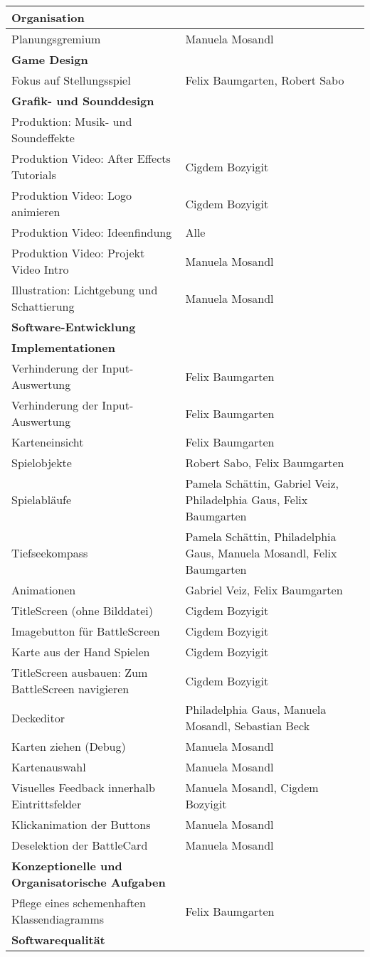 \begin{tabular}{|p{8cm}|p{10cm}|}
\hline
\textbf{Organisation} &  \\ \hline
Planungsgremium & Manuela Mosandl \\ \hline
\textbf{Game Design} &  \\ \hline
Fokus auf Stellungsspiel & Felix Baumgarten, Robert Sabo \\ \hline
\textbf{Grafik- und Sounddesign} & \\ \hline
Produktion: Musik- und Soundeffekte & \\ \hline
Produktion Video: After Effects Tutorials & Cigdem Bozyigit \\ \hline
Produktion Video: Logo animieren & Cigdem Bozyigit \\ \hline
Produktion Video: Ideenfindung & Alle \\ \hline
Produktion Video: Projekt Video Intro & Manuela Mosandl \\ \hline
Illustration: Lichtgebung und Schattierung & Manuela Mosandl \\ \hline
\textbf{Software-Entwicklung} & \\ \hline
\textbf{Implementationen} & \\ \hline
Verhinderung der Input-Auswertung & Felix Baumgarten \\ \hline
Verhinderung der Input-Auswertung & Felix Baumgarten \\ \hline
Karteneinsicht & Felix Baumgarten \\ \hline
Spielobjekte & Robert Sabo, Felix Baumgarten \\ \hline
Spielabläufe & Pamela Schättin, Gabriel Veiz, Philadelphia Gaus, Felix Baumgarten \\ \hline
Tiefseekompass & Pamela Schättin, Philadelphia Gaus, Manuela Mosandl, Felix Baumgarten \\ \hline
Animationen & Gabriel Veiz, Felix Baumgarten \\ \hline
TitleScreen (ohne Bilddatei) & Cigdem Bozyigit \\ \hline
Imagebutton für BattleScreen & Cigdem Bozyigit \\ \hline
Karte aus der Hand Spielen & Cigdem Bozyigit \\ \hline
TitleScreen ausbauen: Zum BattleScreen navigieren & Cigdem Bozyigit \\ \hline
Deckeditor & Philadelphia Gaus, Manuela Mosandl, Sebastian Beck \\ \hline
Karten ziehen (Debug) & Manuela Mosandl \\ \hline
Kartenauswahl & Manuela Mosandl \\ \hline
Visuelles Feedback innerhalb Eintrittsfelder & Manuela Mosandl, Cigdem Bozyigit \\ \hline
Klickanimation der Buttons & Manuela Mosandl \\ \hline
Deselektion der BattleCard & Manuela Mosandl \\ \hline
\textbf{Konzeptionelle und Organisatorische Aufgaben} & \\ \hline
Pflege eines schemenhaften Klassendiagramms  & Felix Baumgarten \\ \hline
\textbf{Softwarequalität} & \\
\hline
\end{tabular}